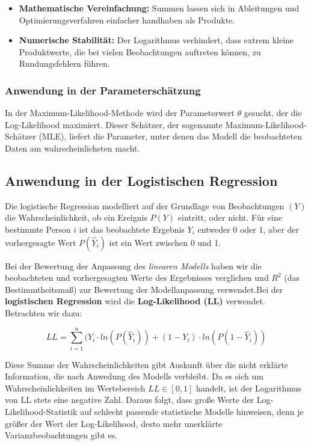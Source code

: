 \documentclass[
]{article}
\begin{document}
\begin{itemize}
\item
  \textbf{Mathematische Vereinfachung:} Summen lassen sich in Ableitungen und Optimierungsverfahren einfacher handhaben als Produkte.
\item
  \textbf{Numerische Stabilität:} Der Logarithmus verhindert, dass extrem kleine Produktwerte, die bei vielen Beobachtungen auftreten können, zu Rundungsfehlern führen.
\end{itemize}

\subsubsection{Anwendung in der Parameterschätzung}\label{anwendung-in-der-parameterschuxe4tzung}

In der Maximum-Likelihood-Methode wird der Parameterwert \(\theta\) gesucht, der die Log-Likelihood maximiert. Dieser Schätzer, der sogenannte Maximum-Likelihood-Schätzer (MLE), liefert die Parameter, unter denen das Modell die beobachteten Daten am wahrscheinlichsten macht.

\subsection{Anwendung in der Logistischen Regression}\label{anwendung-in-der-logistischen-regression}

Die logistische Regression modelliert auf der Grundlage von Beobachtungen \((Y)\) die Wahrscheinlichkeit, ob ein Ereignis \(P(Y)\) eintritt, oder nicht. Für eine bestimmte Person \(i\) ist das beobachtete Ergebnis \(Y_i\) entweder 0 oder 1, aber der vorhergesagte Wert \(P(\hat{Y}_i)\) ist ein Wert zwischen 0 und 1.

Bei der Bewertung der Anpassung des \emph{linearen Modells} haben wir die beobachteten und vorhergesagten Werte des Ergebnisses verglichen und \(R^2\) (das Bestimmtheitsmaß) zur Bewertung der Modellanpassung verwendet.Bei der \textbf{logistischen Regression} wird die \textbf{Log-Likelihood (LL)} verwendet. Betrachten wir dazu:

\[LL = \sum_{i=1}^{n}(Y_i \cdot ln(P(\hat{Y}_i)) + (1 - Y_i) \cdot ln(P(1 - \hat{Y}_i))\]

Diese Summe der Wahrscheinlichkeiten gibt Auskunft über die nicht erklärte Information, die nach Anwedung des Modells verbleibt. Da es sich um Wahrscheinlichkeiten im Wertebereich \(LL \in [0, 1]\) handelt, ist der Logarithmus von LL stets eine negative Zahl. Daraus folgt, dass große Werte der Log-Likelihood-Statistik auf schlecht passende statistische Modelle hinweisen, denn je größer der Wert der Log-Likelihood, desto mehr unerklärte Varianzbeobachtungen gibt es.
\end{document}
